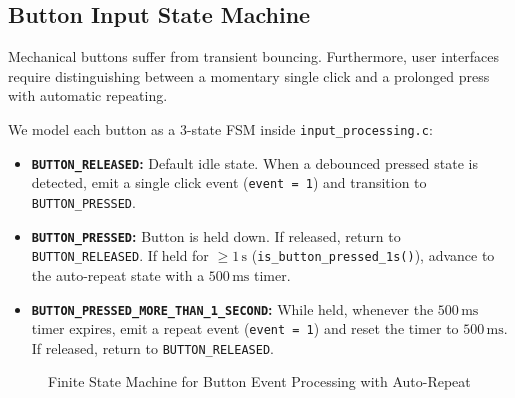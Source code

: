 \documentclass{hcmut-report}
\begin{document}
\subsection{Button Input State Machine}
Mechanical buttons suffer from transient bouncing. Furthermore, user interfaces require distinguishing between a momentary single click and a prolonged press with automatic repeating. 

We model each button as a 3-state FSM inside \texttt{input\_processing.c}:
\begin{itemize}
    \item \textbf{\texttt{BUTTON\_RELEASED}:} Default idle state. When a debounced pressed state is detected, emit a single click event (\texttt{event = 1}) and transition to \texttt{BUTTON\_PRESSED}.
    \item \textbf{\texttt{BUTTON\_PRESSED}:} Button is held down. If released, return to \texttt{BUTTON\_RELEASED}. If held for $\ge 1\,\text{s}$ (\texttt{is\_button\_pressed\_1s()}), advance to the auto-repeat state with a $500\,\text{ms}$ timer.
    \item \textbf{\texttt{BUTTON\_PRESSED\_}\allowbreak\texttt{MORE\_}\allowbreak\texttt{THAN\_}\allowbreak\texttt{1\_SECOND}:} While held, whenever the $500\,\text{ms}$ timer expires, emit a repeat event (\texttt{event = 1}) and reset the timer to $500\,\text{ms}$. If released, return to \texttt{BUTTON\_RELEASED}.
\end{itemize}

\begin{figure}[H]
\centering
{}
\caption{Finite State Machine for Button Event Processing with Auto-Repeat}
\label{fig:button_fsm}
\end{figure}
\end{document}
